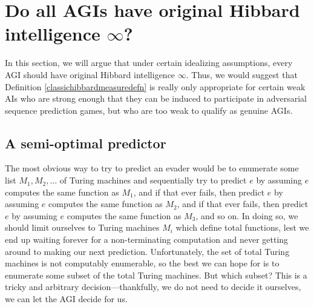 \documentclass{article}
\begin{document}
\section{Do all AGIs have original Hibbard intelligence $\infty$?}
\label{trivialitysection}

In this section, we will argue that under certain idealizing
assumptions, every AGI should have original Hibbard intelligence $\infty$.
Thus, we would suggest that Definition \ref{classichibbardmeasuredefn} is really
only appropriate for certain weak AIs who are strong enough that they can be
induced to participate in adversarial sequence prediction games, but who are
too weak to qualify as genuine AGIs.


\subsection{A semi-optimal predictor}
\label{semioptimalpredictorsubsection}

The most obvious way to try to predict an evader would be to
enumerate some list $M_1,M_2,\ldots$ of Turing machines and
sequentially try to predict $e$ by assuming $e$ computes the same
function as $M_1$, and if that ever fails, then predict $e$ by
assuming $e$ computes the same function as $M_2$, and if that ever
fails, then predict $e$ by assuming $e$ computes the same function
as $M_3$, and so on. In doing so, we should limit ourselves
to Turing machines $M_i$ which define total functions, lest
we end up waiting forever for a non-terminating computation
and never getting around to making our next
prediction. Unfortunately, the set of total Turing machines is
not computably enumerable, so the best we can hope for is to enumerate
some subset of the total Turing machines. But which subset? This is
a tricky and arbitrary decision---thankfully, we do not need to
decide it ourselves, we can let the AGI decide for us.
\end{document}
